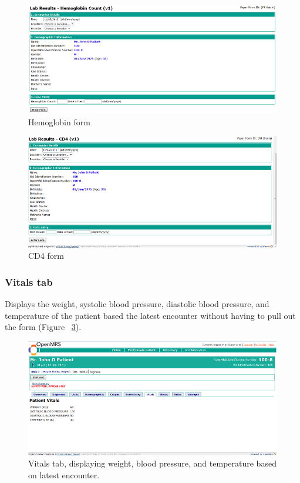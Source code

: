 \documentclass[12pt,letterpaper]{article}
\begin{document}
\begin{figure}\begin{center}
\includegraphics[width=6.5in]{user_guide/hemoglobin_form.png}
\end{center}
\caption{Hemoglobin form}
\label{fig:HEMOGLOBIN_FORM}
\end{figure}

\begin{figure}\begin{center}
\includegraphics[width=6.5in]{user_guide/cd4_form.png}
\end{center}
\caption{CD4 form}
\label{fig:CD4_FORM}
\end{figure}


\subsubsection{Vitals tab}
	Displays the weight, systolic blood pressure, diastolic blood pressure, and temperature of the patient based the latest encounter without having to pull out the form (Figure ~\ref{fig:VITALS_TAB}).

\begin{figure}\begin{center}
\includegraphics[width=6.5in]{user_guide/vitals_tab.png}
\end{center}
\caption{Vitals tab, displaying weight, blood pressure, and temperature 
based on latest encounter.}
\label{fig:VITALS_TAB}
\end{figure}
\end{document}
